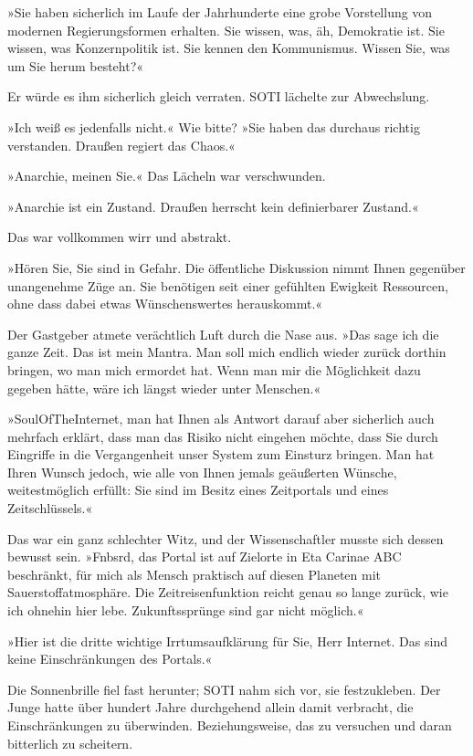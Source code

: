 »Sie haben sicherlich im Laufe der Jahrhunderte eine grobe Vorstellung von modernen Regierungsformen erhalten. Sie wissen, was, äh, Demokratie ist. Sie wissen, was Konzernpolitik ist. Sie kennen den Kommunismus. Wissen Sie, was um Sie herum besteht?«

Er würde es ihm sicherlich gleich verraten. SOTI lächelte zur Abwechslung.

»Ich weiß es jedenfalls nicht.« Wie bitte? »Sie haben das durchaus richtig verstanden. Draußen regiert das Chaos.«

»Anarchie, meinen Sie.« Das Lächeln war verschwunden.

»Anarchie ist ein Zustand. Draußen herrscht kein definierbarer Zustand.«

Das war vollkommen wirr und abstrakt.

»Hören Sie, Sie sind in Gefahr. Die öffentliche Diskussion nimmt Ihnen gegenüber unangenehme Züge an. Sie benötigen seit einer gefühlten Ewigkeit Ressourcen, ohne dass dabei etwas Wünschenswertes herauskommt.«

Der Gastgeber atmete verächtlich Luft durch die Nase aus. »Das sage ich die ganze Zeit. Das ist mein Mantra. Man soll mich endlich wieder zurück dorthin bringen, wo man mich ermordet hat. Wenn man mir die Möglichkeit dazu gegeben hätte, wäre ich längst wieder unter Menschen.«

»SoulOfTheInternet, man hat Ihnen als Antwort darauf aber sicherlich auch mehrfach erklärt, dass man das Risiko nicht eingehen möchte, dass Sie durch Eingriffe in die Vergangenheit unser System zum Einsturz bringen. Man hat Ihren Wunsch jedoch, wie alle von Ihnen jemals geäußerten Wünsche, weitestmöglich erfüllt: Sie sind im Besitz eines Zeitportals und eines Zeitschlüssels.«

Das war ein ganz schlechter Witz, und der Wissenschaftler musste sich dessen bewusst sein. »Fnbsrd, das Portal ist auf Zielorte in Eta Carinae ABC beschränkt, für mich als Mensch praktisch auf diesen Planeten mit Sauerstoffatmosphäre. Die Zeitreisenfunktion reicht genau so lange zurück, wie ich ohnehin hier lebe. Zukunftssprünge sind gar nicht möglich.«

»Hier ist die dritte wichtige Irrtumsaufklärung für Sie, Herr Internet. Das sind keine Einschränkungen des Portals.«

Die Sonnenbrille fiel fast herunter; SOTI nahm sich vor, sie festzukleben. Der Junge hatte über hundert Jahre durchgehend allein damit verbracht, die Einschränkungen zu überwinden. Beziehungsweise, das zu versuchen und daran bitterlich zu scheitern.


